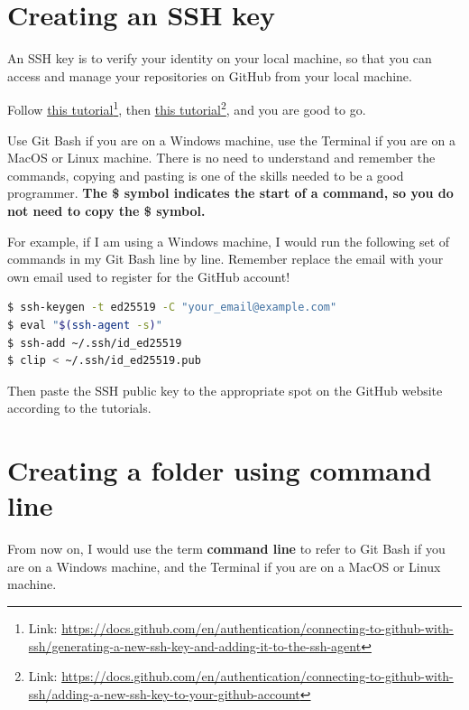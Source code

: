\section{Creating an SSH key}

An SSH key is to verify your identity on your local machine, so that you can access and manage your repositories on GitHub from your local machine.

Follow \href{https://docs.github.com/en/authentication/connecting-to-github-with-ssh/generating-a-new-ssh-key-and-adding-it-to-the-ssh-agent}{this tutorial}\footnote{Link: \url{https://docs.github.com/en/authentication/connecting-to-github-with-ssh/generating-a-new-ssh-key-and-adding-it-to-the-ssh-agent}}, then \href{https://docs.github.com/en/authentication/connecting-to-github-with-ssh/adding-a-new-ssh-key-to-your-github-account}{this tutorial}\footnote{Link: \url{https://docs.github.com/en/authentication/connecting-to-github-with-ssh/adding-a-new-ssh-key-to-your-github-account}}, and you are good to go. 
\vspace{6mm}

Use Git Bash if you are on a Windows machine, use the Terminal if you are on a MacOS or Linux machine. There is no need to understand and remember the commands, copying and pasting is one of the skills needed to be a good programmer. \textbf{The \$ symbol indicates the start of a command, so you do not need to copy the \$ symbol.}
\vspace{6mm}

For example, if I am using a Windows machine, I would run the following set of commands in my Git Bash line by line. Remember replace the email with your own email used to register for the GitHub account!

\begin{lstlisting}[language=bash]
$ ssh-keygen -t ed25519 -C "your_email@example.com"
$ eval "$(ssh-agent -s)"
$ ssh-add ~/.ssh/id_ed25519
$ clip < ~/.ssh/id_ed25519.pub
\end{lstlisting}

Then paste the SSH public key to the appropriate spot on the GitHub website according to the tutorials.

\section{Creating a folder using command line}
\label{sec:install5}

From now on, I would use the term \textbf{command line} to refer to Git Bash if you are on a Windows machine, and the Terminal if you are on a MacOS or Linux machine. 

